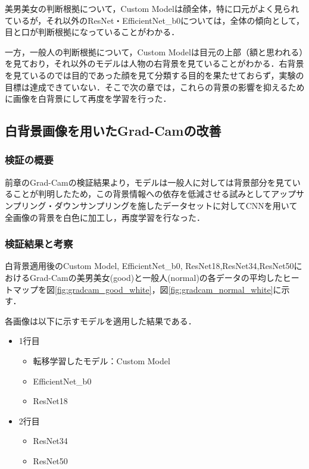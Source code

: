 \documentclass[a4paper,11pt,titlepage]{jsarticle}
\begin{document}
美男美女の判断根拠について，Custom Modelは顔全体，特に口元がよく見られているが，それ以外のResNet・EfficientNet\_b0については，全体の傾向として，目と口が判断根拠になっていることがわかる．\par
一方，一般人の判断根拠について，Custom Modelは目元の上部（額と思われる）を見ており，それ以外のモデルは人物の右背景を見ていることがわかる．右背景を見ているのでは目的であった顔を見て分類する目的を果たせておらず，実験の目標は達成できていない．そこで次の章では，これらの背景の影響を抑えるために画像を白背景にして再度を学習を行った．




\subsection{白背景画像を用いたGrad-Camの改善}
\subsubsection{検証の概要}
前章のGrad-Camの検証結果より，モデルは一般人に対しては背景部分を見ていることが判明したため，この背景情報への依存を低減させる試みとしてアップサンプリング・ダウンサンプリングを施したデータセットに対してCNNを用いて全画像の背景を白色に加工し，再度学習を行なった．

\subsubsection{検証結果と考察}
白背景適用後のCustom Model, EfficientNet\_b0, ResNet18,ResNet34,ResNet50におけるGrad-Camの美男美女(good)と一般人(normal)の各データの平均したヒートマップを図\ref{fig:gradcam_good_white}，図\ref{fig:gradcam_normal_white}に示す．

各画像は以下に示すモデルを適用した結果である．
\begin{itemize}
	\item 1行目
	\begin{itemize}
	\item 転移学習したモデル：Custom Model
	\item EfficientNet\_b0
	\item ResNet18
	\end{itemize}
	\item 2行目
	\begin{itemize}
	\item ResNet34
	\item ResNet50
	\end{itemize}
\end{itemize}
\end{document}
